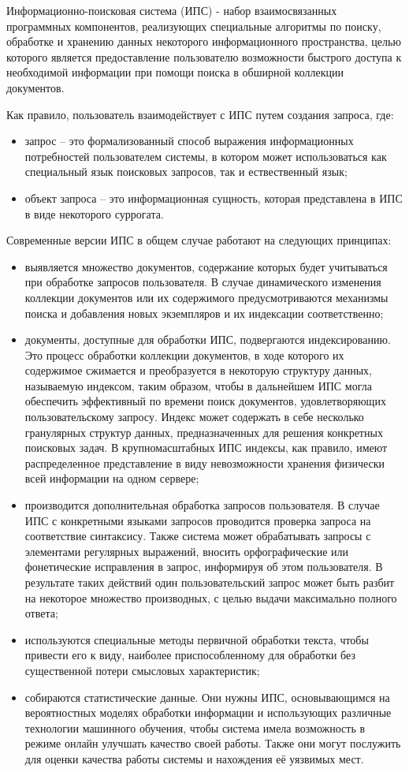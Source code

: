 Информационно-поисковая система (ИПС) - набор взаимосвязанных программных компонентов, реализующих специальные алгоритмы по поиску, обработке и хранению данных некоторого информационного пространства, целью которого является предоставление пользователю возможности быстрого доступа к необходимой информации при помощи поиска в обширной коллекции документов.

Как правило, пользователь взаимодействует с ИПС путем создания запроса, где:
\begin{itemize}
\item запрос -- это формализованный способ выражения информационных потребностей пользователем системы, в котором может использоваться как специальный язык поисковых запросов, так и ествественный язык;
\item объект запроса -- это информационная сущность, которая представлена в ИПС в виде некоторого суррогата.
\end{itemize}

Современные версии ИПС в общем случае работают на следующих принципах:
\begin{itemize}
\item выявляется множество документов, содержание которых будет учитываться при обработке запросов пользователя. В случае динамического изменения коллекции документов или их содержимого предусмотриваются механизмы поиска и добавления новых экземпляров и их индексации соответственно;
\item документы, доступные для обработки ИПС, подвергаются индексированию. Это процесс обработки коллекции документов, в ходе которого их содержимое сжимается и преобразуется в некоторую структуру данных, называемую индексом, таким образом, чтобы в дальнейшем ИПС могла обеспечить эффективный по времени поиск документов, удовлетворяющих пользовательскому запросу. Индекс может содержать в себе несколько гранулярных структур данных, предназначенных для решения конкретных поисковых задач. В крупномасштабных ИПС индексы, как правило, имеют распределенное представление в виду невозможности хранения физически всей информации на одном сервере;
\item производится дополнительная обработка запросов пользователя. В случае ИПС с конкретными языками запросов проводится проверка запроса на соответствие синтаксису. Также система может обрабатывать запросы с элементами регулярных выражений, вносить орфографические или фонетические исправления в запрос, информируя об этом пользователя. В результате таких действий один пользовательский запрос может быть разбит на некоторое множество производных, с целью выдачи максимально полного ответа;
\item используются специальные методы первичной обработки текста, чтобы привести его к виду, наиболее приспособленному для обработки без существенной потери смысловых характеристик;
\item собираются статистические данные. Они нужны ИПС, основывающимся на вероятностных моделях обработки информации и использующих различные технологии машинного обучения, чтобы система имела возможность в режиме онлайн улучшать качество своей работы. Также они могут послужить для оценки качества работы системы и нахождения её уязвимых мест.
\end{itemize}


